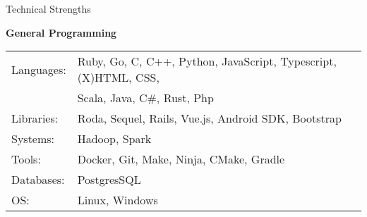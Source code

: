 \documentclass{resume} %
\newcommand{\btab}[2]{
	\bgroup
	\def\arraystretch{#1}
	\begin{tabular}{#2}
}
\newcommand{\etab}{
	\end{tabular} \smallskip
	\egroup
}
\begin{document}

\begin{rSection}{Technical Strengths}

{\bf General Programming}

\btab{1.1}{ l l }
	Languages: &  Ruby, Go, C, C++, Python, JavaScript, Typescript, (X)HTML, CSS, \\
	& Scala, Java, C\#, Rust, Php \\
	Libraries: & Roda, Sequel, Rails, Vue.js, Android SDK, Bootstrap \\
	Systems: & Hadoop, Spark \\
	Tools: & Docker, Git, Make, Ninja, CMake, Gradle \\
	Databases: & PostgresSQL \\
	OS: & Linux, Windows \\
\etab

\end{rSection}
\end{document}
